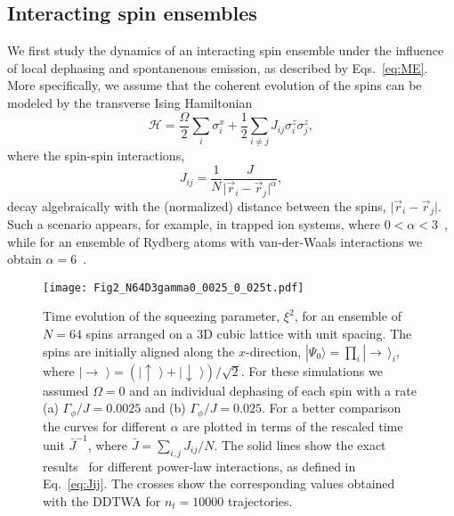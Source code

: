 \documentclass[pra,twocolumn,showpacs,preprintnumbers,amsmath,amssymb,superscriptaddress]{revtex4-1}
\newcommand{\ket}[1]{|#1\rangle}
\newcommand{\abs}[1]{\lvert#1\rvert}
\newcommand{\sz}{\sigma^{z}}
\newcommand{\sx}{\sigma^{x}}
\begin{document}
\subsection{Interacting spin ensembles}
We first study the dynamics of an interacting spin ensemble under the influence of local dephasing and spontanenous emission, as described by Eqs.~\eqref{eq:ME}. More specifically, we assume that the  coherent evolution of the spins can be modeled by the transverse Ising Hamiltonian
\begin{equation}
\mathcal{H}= \frac{\Omega}{2} \sum_i \sx_i + \frac{1}{2}\sum_{i\neq j} J_{ij}  \sz_i \sz_j ,
\label{eq:HamZ}
\end{equation}
 where the spin-spin interactions,
\begin{equation}\label{eq:Jij}
J_{ij}=\frac{1}{N}\frac{J}{\abs{\vec r_i-\vec r_j}^{\alpha}},
\end{equation}
decay algebraically with the (normalized) distance between the spins, $\abs{\vec r_i-\vec r_j}$. Such a scenario appears, for example, in trapped ion systems, where $0<\alpha<3$~\cite{Bollinger2012,Richerme2014,Islam2013}, while for an ensemble of Rydberg atoms with van-der-Waals interactions we obtain $\alpha=6$~\cite{Labuhn2016,Bernien2017,Browaeys2020}.  



\begin{figure}[t]
	\centering
	\texttt{[image: Fig2\_N64D3gamma0\_0025\_0\_025t.pdf]}
	\caption{Time evolution of the squeezing parameter, $\xi^2$, for an ensemble of $N=64$ spins arranged on a 3D cubic lattice with unit spacing. The spins are initially aligned along the $x$-direction, $|\Psi_0\rangle=\prod_i |\rightarrow\,\rangle_i$, where $\ket{\rightarrow\,\,}=(\ket{\uparrow\,\,}+\ket{\downarrow\,\,})/\sqrt{2}$. For these simulations we assumed $\Omega=0$ and an individual dephasing of each spin with a rate (a) $\Gamma_\phi/J=0.0025$ and (b) $\Gamma_\phi/J=0.025$. For a better comparison the curves for different $\alpha$ are plotted in terms of the rescaled time unit $\bar J^{-1}$, where $\bar J=\sum_{i,j}J_{ij}/N$. The solid lines show the exact results~\cite{FossFeig2013} for different power-law interactions, as defined in Eq.~\eqref{eq:Jij}. The crosses show the corresponding values obtained with the DDTWA for $n_t=10000$ trajectories. }
	\label{fig:ZZDephasingAlpha}
\end{figure}
\end{document}

